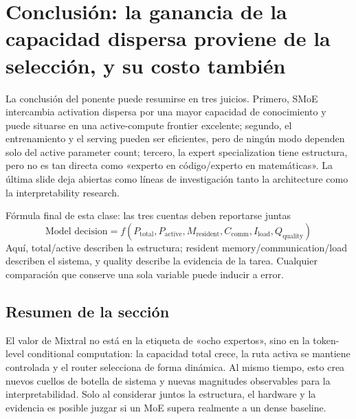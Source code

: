 \section{Conclusión: la ganancia de la capacidad dispersa proviene de la selección, y su costo también}

La conclusión del ponente puede resumirse en tres juicios. Primero, SMoE intercambia activation dispersa por una mayor capacidad de conocimiento y puede situarse en una active-compute frontier excelente; segundo, el entrenamiento y el serving pueden ser eficientes, pero de ningún modo dependen solo del active parameter count; tercero, la expert specialization tiene estructura, pero no es tan directa como «experto en código/experto en matemáticas». La última slide deja abiertas como líneas de investigación tanto la architecture como la interpretability research.


\begin{importantbox}{Fórmula final de esta clase: las tres cuentas deben reportarse juntas}
\[
\boxed{\text{Model decision}=f(P_{\text{total}},P_{\text{active}},M_{\text{resident}},C_{\text{comm}},I_{\text{load}},Q_{\text{quality}})}
\]
Aquí, total/active describen la estructura; resident memory/communication/load describen el sistema, y quality describe la evidencia de la tarea. Cualquier comparación que conserve una sola variable puede inducir a error.
\end{importantbox}


\subsection{Resumen de la sección}

El valor de Mixtral no está en la etiqueta de «ocho expertos», sino en la token-level conditional computation: la capacidad total crece, la ruta activa se mantiene controlada y el router selecciona de forma dinámica. Al mismo tiempo, esto crea nuevos cuellos de botella de sistema y nuevas magnitudes observables para la interpretabilidad. Solo al considerar juntos la estructura, el hardware y la evidencia es posible juzgar si un MoE supera realmente a un dense baseline.

